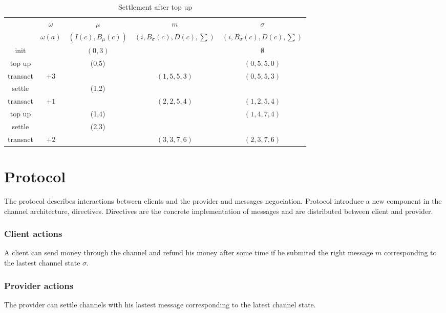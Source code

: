 \documentclass{llncs}
\begin{document}
\begin{table}[t]
  \begin{tabularx}{\textwidth}{| S | S | C | C | C |}
       & $\omega$ & $\mu$ & $m$ & $\sigma$ \\ 
       & $\omega(a)$ & $(I(c), B_\mu(c))$ & $(i, B_\sigma(c), D(c), \sum)$ & $(i, B_\sigma(c), D(c), \sum)$ \\
  \hhline{-====}
      init & & $(0,3)$ & & $\emptyset$ \\
      top up & & (0,5) & & $(0, 5, 5, 0)$ \\
      transact & $+3$ & & $(1, 5, 5, 3)$ & $(0, 5, 5, 3)$ \\
      settle & & (1,2) & & \\
      transact & $+1$ & & $(2, 2, 5, 4)$ & $(1, 2, 5, 4)$ \\
      top up & & (1,4) & & $(1, 4, 7, 4)$ \\
      settle & & (2,3) & & \\
      transact & $+2$ & & $(3, 3, 7, 6)$ & $(2, 3, 7, 6)$ \\
  \end{tabularx}
  \medskip
  \caption{Settlement after top up}
\end{table}

\section{Protocol} The protocol describes interactions between clients and the provider and messages negociation. Protocol introduce a new component in the channel architecture, directives. Directives are the concrete implementation of messages and are distributed between client and provider.

\subsubsection{Client actions} A client can send money through the channel and refund his money after some time if he submited the right message $m$ corresponding to the lastest channel state $\sigma$.

\subsubsection{Provider actions} The provider can settle channels with his lastest message corresponding to the latest channel state.
\end{document}
